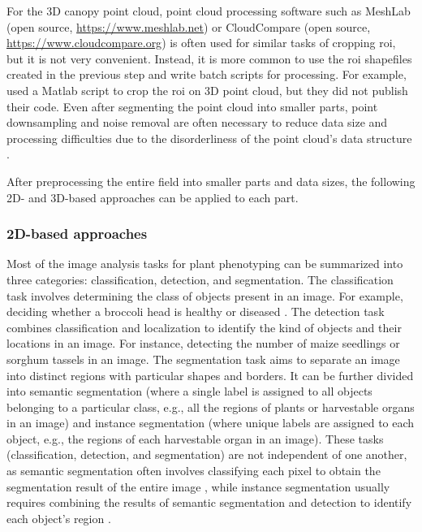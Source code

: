 For the 3D canopy point cloud, point cloud processing software such as MeshLab (open source, \url{https://www.meshlab.net}) or CloudCompare (open source, \url{https://www.cloudcompare.org}) is often used for similar tasks of cropping \gls{roi}, but it is not very convenient. Instead, it is more common to use the \gls{roi} shapefiles created in the previous step and write batch scripts for processing. For example, \citet{sun_field_2018} used a Matlab script to crop the \gls{roi} on 3D point cloud, but they did not publish their code. Even after segmenting the point cloud into smaller parts, point downsampling and noise removal are often necessary to reduce data size and processing difficulties due to the disorderliness of the point cloud's data structure \citep{ma_calculation_2019}.

After preprocessing the entire field into smaller parts and data sizes, the following 2D- and 3D-based approaches can be applied to each part.

\subsubsection{2D-based approaches}

Most of the image analysis tasks for plant phenotyping can be summarized into three categories: classification, detection, and segmentation. The classification task involves determining the class of objects present in an image. For example, deciding whether a broccoli head is healthy or diseased \citep{garcia_towards_2021}. The detection task combines classification and localization to identify the kind of objects and their locations in an image. For instance, detecting the number of maize seedlings \citep{liu_estimating_2022} or sorghum tassels \citep{ghosal_weakly_2019} in an image. The segmentation task aims to separate an image into distinct regions with particular shapes and borders. It can be further divided into semantic segmentation (where a single label is assigned to all objects belonging to a particular class, e.g., all the regions of plants or harvestable organs in an image) and instance segmentation (where unique labels are assigned to each object, e.g., the regions of each harvestable organ in an image). These tasks (classification, detection, and segmentation) are not independent of one another, as semantic segmentation often involves classifying each pixel to obtain the segmentation result of the entire image \citep{guo_easypcc_2017}, while instance segmentation usually requires combining the results of semantic segmentation and detection to identify each object's region \citep[see Fig.~2]{luling_using_2021}.

